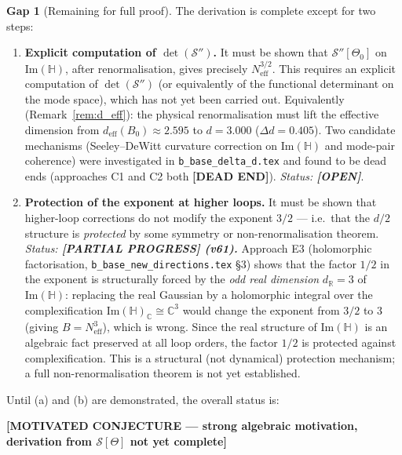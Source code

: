 \documentclass[11pt,a4paper]{article}
\theoremstyle{definition}
\newtheorem{gap}{Gap}
\theoremstyle{remark}
\begin{document}
\begin{gap}[Remaining for full proof]
\label{gap:remaining}
  The derivation is complete except for two steps:
  \begin{enumerate}
    \item[(a)] \textbf{Explicit computation of $\det(\mathcal{S}'')$.}
      It must be shown that $\mathcal{S}''[\Theta_0]$ on $\mathrm{Im}(\mathbb{H})$,
      after renormalisation, gives precisely $N_{\mathrm{eff}}^{3/2}$.
      This requires an explicit computation of $\det(\mathcal{S}'')$
      (or equivalently of the functional determinant on the mode space),
      which has not yet been carried out.
      Equivalently (Remark~\ref{rem:d_eff}): the physical renormalisation
      must lift the effective dimension from
      $d_{\mathrm{eff}}(B_0) \approx 2.595$ to $d = 3.000$ ($\Delta d = 0.405$).
      Two candidate mechanisms (Seeley--DeWitt curvature correction on
      $\mathrm{Im}(\mathbb{H})$ and mode-pair coherence) were investigated in
      \texttt{b\_base\_delta\_d.tex} and found to be dead ends
      (approaches C1 and C2 both \textbf{[DEAD END]}).
      \textit{Status: \textbf{[OPEN]}}.

    \item[(b)] \textbf{Protection of the exponent at higher loops.}
      It must be shown that higher-loop corrections do not modify the exponent
      $3/2$ — i.e.\ that the $d/2$ structure is \emph{protected} by some
      symmetry or non-renormalisation theorem.
      \textit{Status: \textbf{[PARTIAL PROGRESS] (v61).}}
      Approach E3 (holomorphic factorisation, \texttt{b\_base\_new\_directions.tex} §3)
      shows that the factor $1/2$ in the exponent is structurally forced by the
      \emph{odd real dimension} $d_\mathbb{R} = 3$ of $\mathrm{Im}(\mathbb{H})$:
      replacing the real Gaussian by a holomorphic integral over the complexification
      $\mathrm{Im}(\mathbb{H})_\mathbb{C} \cong \mathbb{C}^3$ would change the
      exponent from $3/2$ to $3$ (giving $B = N_{\mathrm{eff}}^3$), which is wrong.
      Since the real structure of $\mathrm{Im}(\mathbb{H})$ is an algebraic fact
      preserved at all loop orders, the factor $1/2$ is protected against complexification.
      This is a structural (not dynamical) protection mechanism;
      a full non-renormalisation theorem is not yet established.
  \end{enumerate}

  Until (a) and (b) are demonstrated, the overall status is:\\
  \centerline{\textbf{[MOTIVATED CONJECTURE — strong algebraic motivation,
  derivation from $\mathcal{S}[\Theta]$ not yet complete]}}
\end{gap}
\end{document}
